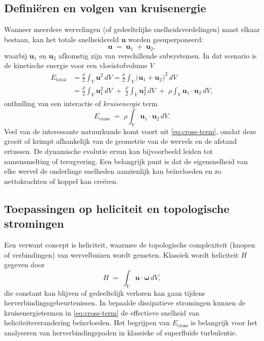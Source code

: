 \subsection{Definiëren en volgen van kruisenergie}
\label{sec:cross}
Wanneer meerdere wervelingen (of gedeeltelijke snelheidsverdelingen) naast elkaar bestaan, kan het totale snelheidsveld $\mathbf{u}$ worden gesuperponeerd:
\begin{equation}
\mathbf{u} \;=\; \mathbf{u}_1 \;+\;\mathbf{u}_2,\label{eq:appendix:superpose}
\end{equation}
waarbij $\mathbf{u}_1$ en $\mathbf{u}_2$ afkomstig zijn van verschillende subsystemen. In dat
scenario is de kinetische energie voor een vloeistofvolume $V$
\begin{align}
E_{\text{total}} &= \frac{\rho}{2} \int_V \mathbf{u}^2 \,dV
= \frac{\rho}{2} \int_V \bigl(\mathbf{u}_1 + \mathbf{u}_2 \bigr)^2\, dV \\
&= \frac{\rho}{2} \int_V \mathbf{u}_1^2 \,dV \;+\;\frac{\rho}{2} \int_V \mathbf{u}_2^2 \,dV
\;+\;\rho \int_V \mathbf{u}_1 \cdot \mathbf{u}_2 \, dV,
\end{align}
onthulling van een interactie of \emph{kruisenergie} term
\begin{equation}
E_{\text{cross}} \;=\; \rho \int_V \mathbf{u}_1 \cdot \mathbf{u}_2 \, dV.
\label{eq:cross-term}
\end{equation}
Veel van de interessante natuurkunde komt voort uit \eqref{eq:cross-term}, omdat deze
groeit of krimpt afhankelijk van de geometrie van de wervels en de afstand ertussen.
De dynamische evolutie ervan kan bijvoorbeeld leiden tot samensmelting of terugvering. Een belangrijk punt is dat
de eigensnelheid van elke wervel de onderlinge snelheden aanzienlijk kan beïnvloeden en zo
nettokrachten of koppel kan creëren.
\subsection{Toepassingen op heliciteit en topologische stromingen}
\label{sec:helicity}
Een verwant concept is heliciteit, waarmee de topologische complexiteit (knopen of
verbindingen) van wervelbuizen wordt gemeten. Klassiek wordt heliciteit $H$ gegeven door
\begin{equation}
H \;=\; \int_V \mathbf{u} \cdot \boldsymbol{\omega}\, dV,\label{eq:appendix:helicity}
\end{equation}
die constant kan blijven of gedeeltelijk verloren kan gaan tijdens herverbindingsgebeurtenissen. In bepaalde
dissipatieve stromingen kunnen de kruisenergietermen in \eqref{eq:cross-term} de effectieve snelheid van heliciteitsverandering beïnvloeden. Het begrijpen van $E_{\text{cross}}$ is belangrijk
voor het analyseren van herverbindingspaden in klassieke of superfluïde turbulentie.

